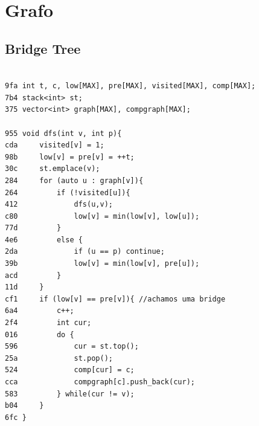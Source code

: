 \documentclass[11pt, a4paper, twoside]{article}
\begin{document}
%
%

\section{Grafo}

\subsection{Bridge Tree}
\begin{lstlisting}

9fa int t, c, low[MAX], pre[MAX], visited[MAX], comp[MAX];
7b4 stack<int> st;
375 vector<int> graph[MAX], compgraph[MAX];

955 void dfs(int v, int p){
cda     visited[v] = 1;
98b     low[v] = pre[v] = ++t;
30c     st.emplace(v);
284     for (auto u : graph[v]){
264         if (!visited[u]){
412             dfs(u,v);
c80             low[v] = min(low[v], low[u]);
77d         }   
4e6         else {
2da             if (u == p) continue;
39b             low[v] = min(low[v], pre[u]);
acd         }
11d     }
cf1     if (low[v] == pre[v]){ //achamos uma bridge
6a4         c++;
2f4         int cur;
016         do {
596             cur = st.top();
25a             st.pop();
524             comp[cur] = c;
cca             compgraph[c].push_back(cur);
583         } while(cur != v);
b04     }
6fc }
\end{lstlisting}
\end{document}
